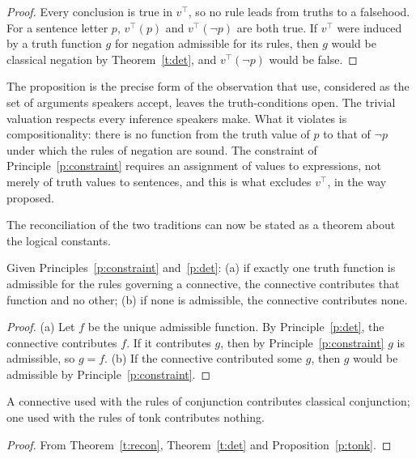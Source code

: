 \documentclass{situationist-preprint}
\begin{document}
\begin{proof}
Every conclusion is true in $v^\top$, so no rule leads from truths to a falsehood. For a sentence letter $p$, $v^\top(p)$ and $v^\top(\neg p)$ are both true. If $v^\top$ were induced by a truth function $g$ for negation admissible for its rules, then $g$ would be classical negation by Theorem~\ref{t:det}, and $v^\top(\neg p)$ would be false.
\end{proof}

The proposition is the precise form of the observation that use, considered as the set of arguments speakers accept, leaves the truth-conditions open. The trivial valuation respects every inference speakers make. What it violates is compositionality: there is no function from the truth value of $p$ to that of $\neg p$ under which the rules of negation are sound. The constraint of Principle~\ref{p:constraint} requires an assignment of values to expressions, not merely of truth values to sentences, and this is what excludes $v^\top$, in the way \citet{BonnayWesterstahl2016} proposed.

The reconciliation of the two traditions can now be stated as a theorem about the logical constants.

\begin{theorem}[Reconciliation]\label{t:recon}
Given Principles~\ref{p:constraint} and~\ref{p:det}: (a) if exactly one truth function is admissible for the rules governing a connective, the connective contributes that function and no other; (b) if none is admissible, the connective contributes none.
\end{theorem}

\begin{proof}
(a) Let $f$ be the unique admissible function. By Principle~\ref{p:det}, the connective contributes $f$. If it contributes $g$, then by Principle~\ref{p:constraint} $g$ is admissible, so $g = f$. (b) If the connective contributed some $g$, then $g$ would be admissible by Principle~\ref{p:constraint}.
\end{proof}

\begin{corollary}\label{c:conj}
A connective used with the rules of conjunction contributes classical conjunction; one used with the rules of tonk contributes nothing.
\end{corollary}

\begin{proof}
From Theorem~\ref{t:recon}, Theorem~\ref{t:det} and Proposition~\ref{p:tonk}.
\end{proof}
\end{document}
